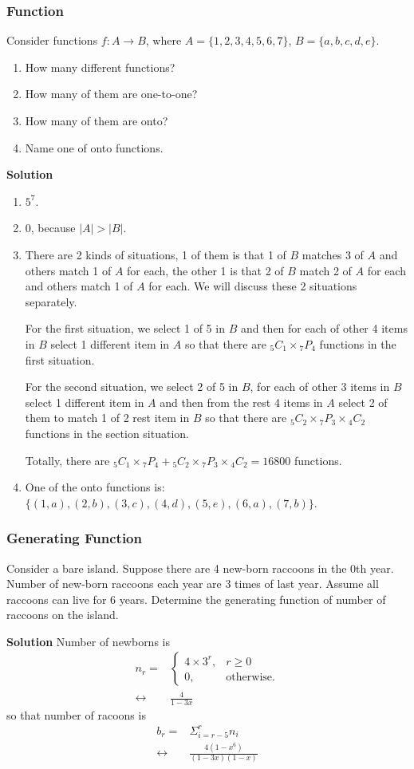 \documentclass[10pt, compress]{beamer}
\begin{document}
\begin{frame}[allowframebreaks]
\frametitle{Function}
Consider functions $f \colon A \rightarrow B$, where $A = \{1, 2, 3, 4, 5, 6, 7\}$, $B = \{a, b, c, d, e\}$.\begin{enumerate}
	\item How many different functions?
	\item How many of them are one-to-one?
	\item How many of them are onto?
	\item Name one of onto functions.
\end{enumerate}
\textbf{Solution} \begin{enumerate}
	\item $5^7$.
	\item $0$, because $|A| > |B|$.
	\item There are 2 kinds of situations, 1 of them is that 1 of $B$ matches 3 of $A$ and others match 1 of $A$ for each, the other 1 is that 2 of $B$ match 2 of $A$ for each and others match 1 of $A$ for each. We will discuss these 2 situations separately.
	
	For the first situation, we select 1 of 5 in $B$ and then for each of other 4 items in $B$ select 1 different item in $A$ so that there are ${}_5 C_1 \times {}_7 P_4$ functions in the first situation.
	
	For the second situation, we select 2 of 5 in $B$, for each of other 3 items in $B$ select 1 different item in $A$ and then from the rest 4 items in $A$ select 2 of them to match 1 of 2 rest item in $B$ so that there are ${}_5 C_2 \times {}_7 P_3 \times {}_4 C_2$ functions in the section situation.
	
	Totally, there are ${}_5 C_1 \times {}_7 P_4 + {}_5 C_2 \times {}_7 P_3 \times {}_4 C_2 = 16800$ functions.
	
	\item One of the onto functions is: $\{(1, a), (2, b), (3, c), (4, d), (5, e), (6, a), (7, b)\}$.
\end{enumerate}
\end{frame}

\begin{frame}[fragile]
\frametitle{Generating Function}
Consider a bare island. Suppose there are 4 new-born raccoons in the 0th year. Number of new-born raccoons each year are 3 times of last year. Assume all raccoons can live for 6 years. Determine the generating function of number of raccoons on the island.

\textbf{Solution} Number of newborns is \begin{align}
n_r = & \begin{cases}
4 \times 3^r, & r \ge 0\\
0, & \text{otherwise}.
\end{cases}\\
\leftrightarrow & \frac{4}{1 - 3x}
\end{align} so that number of racoons is \begin{align}
b_r = & \Sigma_{i = r - 5}^{r} n_i\\
\leftrightarrow & \frac{4(1 - x^6)}{(1 - 3x)(1 - x)}
\end{align}
\end{frame}
\end{document}
